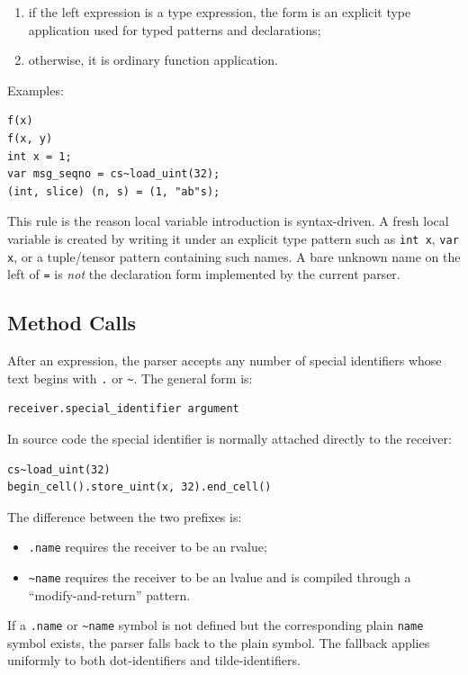 \documentclass[12pt,oneside]{article}
\begin{document}
\begin{enumerate}
\item if the left expression is a type expression, the form is an explicit type
application used for typed patterns and declarations;
\item otherwise, it is ordinary function application.
\end{enumerate}

Examples:

\begin{verbatim}
f(x)
f(x, y)
int x = 1;
var msg_seqno = cs~load_uint(32);
(int, slice) (n, s) = (1, "ab"s);
\end{verbatim}

This rule is the reason local variable introduction is syntax-driven. A fresh
local variable is created by writing it under an explicit type pattern such as
\verb|int x|, \verb|var x|, or a tuple/tensor pattern containing such names.
A bare unknown name on the left of \verb|=| is \emph{not} the declaration form
implemented by the current parser.

\subsection{Method Calls}
\label{sec:method-calls}
After an expression, the parser accepts any number of special identifiers whose
text begins with \verb|.| or \verb|~|. The general form is:

\begin{verbatim}
receiver.special_identifier argument
\end{verbatim}

In source code the special identifier is normally attached directly to the
receiver:

\begin{verbatim}
cs~load_uint(32)
begin_cell().store_uint(x, 32).end_cell()
\end{verbatim}

The difference between the two prefixes is:

\begin{itemize}
\item \verb|.name| requires the receiver to be an rvalue;
\item \verb|~name| requires the receiver to be an lvalue and is compiled through
a ``modify-and-return'' pattern.
\end{itemize}

If a \verb|.name| or \verb|~name| symbol is not defined but the corresponding
plain \verb|name| symbol exists, the parser falls back to the plain symbol.
The fallback applies uniformly to both dot-identifiers and tilde-identifiers.
\end{document}
